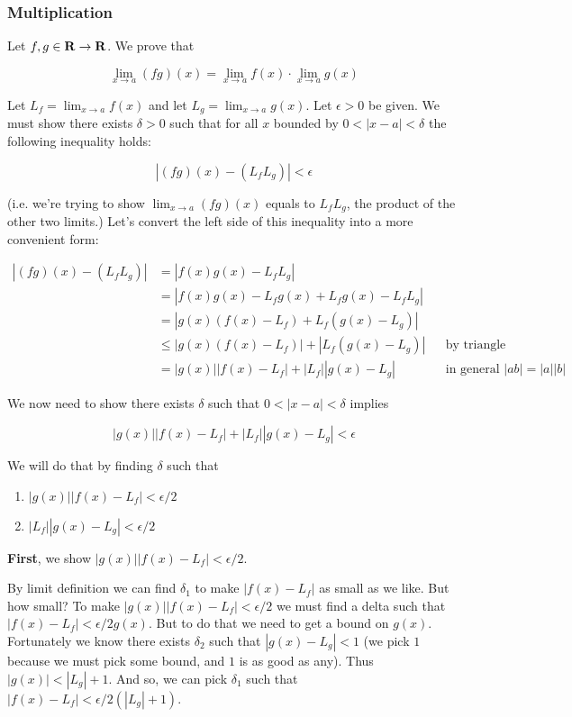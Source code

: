 \subsubsection*{Multiplication}

Let $f,g\in\mathbf{R}\to\mathbf{R}$. We prove that

\[\lim_{x\to a}(fg)(x)=\lim_{x\to a}f(x)\cdot\lim_{x\to a}g(x)\]

Let $L_f=\lim_{x\to a}f(x)$ and let $L_g=\lim_{x\to a}g(x)$. Let
$\epsilon>0$ be given. We must show there exists $\delta>0$ such that for all
$x$ bounded by $0<|x-a|<\delta$ the following inequality holds:

\[|(fg)(x)-(L_fL_g)|<\epsilon\]

(i.e. we're trying to show $\lim_{x\to a}(fg)(x)$ equals to $L_fL_g$,
the product of the other two limits.) Let's convert the left side of
this inequality into a more convenient form:

\begin{align*}
    |(fg)(x)-(L_fL_g)|&=|f(x)g(x)-L_fL_g|\\
    &=|f(x)g(x)-L_fg(x)+L_fg(x)-L_fL_g|\\
    &=|g(x)(f(x)-L_f)+L_f(g(x)-L_g)|\\
    &\leq|g(x)(f(x)-L_f)|+|L_f(g(x)-L_g)|&&\text{by triangle inequality}\\
    &=|g(x)||f(x)-L_f|+|L_f||g(x)-L_g|&&\text{in general } |ab|=|a||b|
\end{align*}

We now need to show there exists $\delta$ such that $0<|x-a|<\delta$ implies

\[|g(x)||f(x)-L_f|+|L_f||g(x)-L_g|<\epsilon\]

We will do that by finding $\delta$ such that

\begin{enumerate}
    \item $|g(x)||f(x)-L_f|<\epsilon/2$
    \item $|L_f||g(x)-L_g|<\epsilon/2$
\end{enumerate}

\textbf{First}, we show $|g(x)||f(x)-L_f|<\epsilon/2$.

\vs

By limit definition we can find $\delta_1$ to make $|f(x)-L_f|$ as small as
we like. But how small? To make $|g(x)||f(x)-L_f|<\epsilon/2$ we must find a
delta such that $|f(x)-L_f|<\epsilon/2g(x)$. But to do that we need to get a
bound on $g(x)$. Fortunately we know there exists $\delta_2$ such that
$|g(x)-L_g|<1$ (we pick $1$ because we must pick some bound, and $1$
is as good as any). Thus $|g(x)|<|L_g|+1$. And so, we can pick
$\delta_1$ such that $|f(x)-L_f|<\epsilon/2(|L_g|+1)$.

